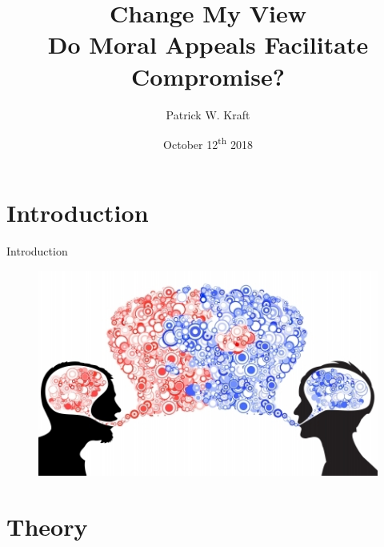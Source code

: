 \documentclass{beamer}
\author{Patrick W. Kraft}
\title{Change My View\\
{\large Do Moral Appeals Facilitate Compromise?}}
\institute{MAPPS Meeting\\Marquette University}
\date{October 12\textsuperscript{th} 2018}
\begin{document}
\section{Introduction}

\frame{\titlepage}

\begin{frame}{Introduction}
\begin{figure}
\includegraphics[scale=.9]{fig/the-conversation.jpeg}
\end{figure}
\end{frame}


\section{Theory}
\end{document}
